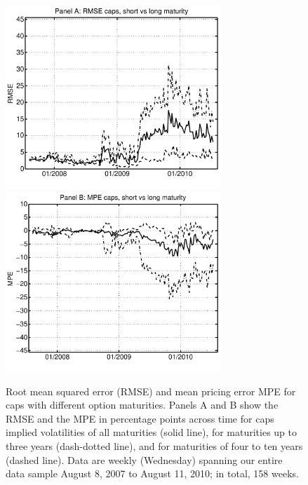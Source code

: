 \documentclass[11pt,a4paper,english,oneside]{book}
\numberwithin{equation}{chapter}
\begin{document}
\begin{figure}[t!]
	\begin{center}
		\includegraphics[width=3.20in]{assets/RMSE_ivcapsjoint.pdf}
		\includegraphics[width=3.20in]{assets/MPE_ivcapsjoint.pdf}
	\end{center}
	\caption[RMSE and  MPE for Caps with Different Maturities]{Root mean squared error (RMSE) and mean pricing error MPE for caps with different option maturities.
		Panels A and B show the RMSE and the MPE in percentage points  across time for caps implied volatilities
		of all maturities (solid line), for maturities up to three years (dash-dotted line), and for maturities of four to ten years (dashed line). Data are
		weekly (Wednesday) spanning our entire data sample August 8, 2007 to
		August 11, 2010; in total, 158 weeks.}
	\label{output2}
\end{figure}
\end{document}
